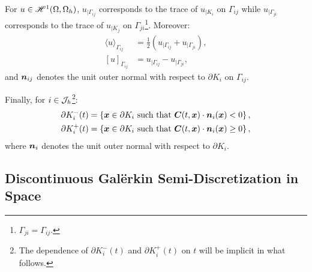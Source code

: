 For $u \in \mathscr{H}^{1}(\Omega, \Omega_h)$, $u_{\mid \Gamma_{ij}}$ corresponds to the trace of $u_{\mid K_i}$ on $\Gamma_{ij}$ while $u_{\mid \Gamma_{ji}}$ corresponds to the trace of $u_{\mid K_j}$ on $\Gamma_{ji}$\footnote{$\Gamma_{ji} = \Gamma_{ij}$.}. Moreover:
\begin{align}
    \langle u \rangle_{\Gamma_{ij}} &= \frac{1}{2} \left( u_{\mid \Gamma_{ij}} + u_{\mid \Gamma_{ji}} \right), \\
    \left[ u \right]_{\Gamma_{ij}} &= u_{\mid \Gamma_{ij}} - u_{\mid \Gamma_{ji}},
\end{align}
and $\bm{n}_{ij}$ denotes the unit outer normal with respect to $\partial K_i$ on $\Gamma_{ij}$.

Finally, for $i \in \mathcal{J}_h$\footnote{The dependence of $\partial K_i^-(t)$ and $\partial K_i^+(t)$ on $t$ will be implicit in what follows.}:
\begin{align}
    \partial K_i^-(t) = \left\{ \bm{x} \in \partial K_i \text{ such that } \bm{C}(t, \bm{x}) \cdot \bm{n}_i(\bm{x}) < 0 \right\}, \\
    \partial K_i^+(t) = \left\{ \bm{x} \in \partial K_i \text{ such that } \bm{C}(t, \bm{x}) \cdot \bm{n}_i(\bm{x}) \geq 0 \right\},
\end{align}
where $\bm{n}_i$ denotes the unit outer normal with respect to $\partial K_i$.

\newpage
\subsection{Discontinuous Galërkin Semi-Discretization in Space}

